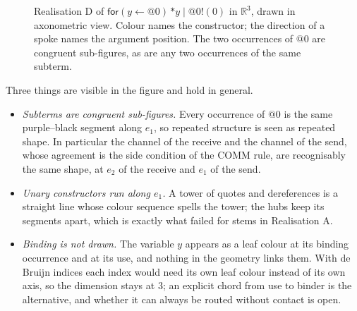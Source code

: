 \documentclass[11pt]{article}
\theoremstyle{definition}
\theoremstyle{remark}
\newcommand{\R}{\mathbb{R}}
\begin{document}
\begin{figure}[!htb]
\centering
{}
\caption{Realisation D of $\mathsf{for}(y\leftarrow @0)\,{*y}\mid @0!(0)$ in
$\R^3$, drawn in axonometric view. Colour names the constructor; the direction of
a spoke names the argument position. The two occurrences of $@0$ are congruent
sub-figures, as are any two occurrences of the same subterm.}\label{fig:rho}
\end{figure}

Three things are visible in the figure and hold in general.
\begin{itemize}
\item \emph{Subterms are congruent sub-figures.} Every occurrence of $@0$ is the
same purple--black segment along $e_1$, so repeated structure is seen as repeated
shape. In particular the channel of the receive and the channel of the send, whose
agreement is the side condition of the COMM rule, are recognisably the same
shape, at $e_2$ of the receive and $e_1$ of the send.
\item \emph{Unary constructors run along $e_1$.} A tower of quotes and
dereferences is a straight line whose colour sequence spells the tower; the hubs
keep its segments apart, which is exactly what failed for stems in
Realisation A.
\item \emph{Binding is not drawn.} The variable $y$ appears as a leaf colour at
its binding occurrence and at its use, and nothing in the geometry links them.
With de Bruijn indices each index would need its own leaf colour instead of its
own axis, so the dimension stays at $3$; an explicit chord from use to binder
is the alternative, and whether it can always be routed without contact is open.
\end{itemize}
\end{document}
